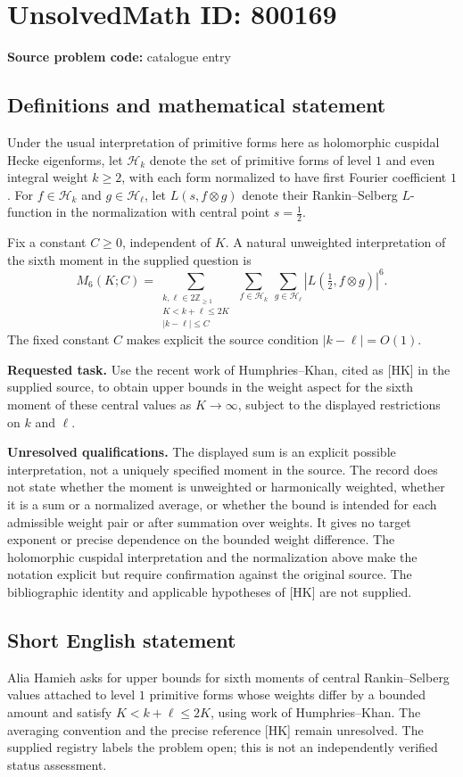 \documentclass[11pt]{article}
\newcommand{\Z}{\mathbb{Z}}
\begin{document}
\section*{UnsolvedMath ID: 800169}
\textbf{Source problem code:} catalogue entry
\subsection{Definitions and mathematical statement}
Under the usual interpretation of primitive forms here as holomorphic cuspidal Hecke eigenforms, let \(\mathcal H_k\) denote the set of primitive forms of level \(1\) and even integral weight \(k\geq 2\), with each form normalized to have first Fourier coefficient \(1\). For \(f\in\mathcal H_k\) and \(g\in\mathcal H_\ell\), let \(L(s,f\otimes g)\) denote their Rankin--Selberg \(L\)-function in the normalization with central point \(s=\tfrac12\).

Fix a constant \(C\geq0\), independent of \(K\). A natural unweighted interpretation of the sixth moment in the supplied question is
\[
M_6(K;C)=
\sum_{\substack{k,\ell\in 2\Z_{\geq1}\\ K<k+\ell\leq2K\\ |k-\ell|\leq C}}
\ \sum_{f\in\mathcal H_k}\ \sum_{g\in\mathcal H_\ell}
\left|L\!\left(\tfrac12,f\otimes g\right)\right|^6.
\]
The fixed constant \(C\) makes explicit the source condition \(|k-\ell|=O(1)\).

\textbf{Requested task.} Use the recent work of Humphries--Khan, cited as [HK] in the supplied source, to obtain upper bounds in the weight aspect for the sixth moment of these central values as \(K\to\infty\), subject to the displayed restrictions on \(k\) and \(\ell\).

\textbf{Unresolved qualifications.} The displayed sum is an explicit possible interpretation, not a uniquely specified moment in the source. The record does not state whether the moment is unweighted or harmonically weighted, whether it is a sum or a normalized average, or whether the bound is intended for each admissible weight pair or after summation over weights. It gives no target exponent or precise dependence on the bounded weight difference. The holomorphic cuspidal interpretation and the normalization above make the notation explicit but require confirmation against the original source. The bibliographic identity and applicable hypotheses of [HK] are not supplied.
\subsection{Short English statement}
Alia Hamieh asks for upper bounds for sixth moments of central Rankin--Selberg values attached to level \(1\) primitive forms whose weights differ by a bounded amount and satisfy \(K<k+\ell\leq2K\), using work of Humphries--Khan. The averaging convention and the precise reference [HK] remain unresolved. The supplied registry labels the problem open; this is not an independently verified status assessment.
\end{document}
